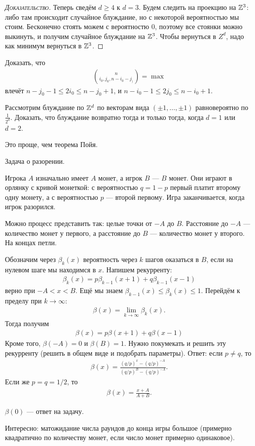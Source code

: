 \documentclass[../main.tex]{subfiles}
\begin{document}
\begin{proof}[\normalfont\textsc{Доказательство}]
 Теперь сведём $ d \geqslant 4 $ к $ d=3 $. Будем следить на проекцию на $ \mathbb{Z}^{3} $: либо там происходит случайное блуждание, но с некоторой вероятностью мы стоим. Бесконечно стоять можем с вероятностю $ 0 $, поэтому все стоянки можно выкинуть, и получим случайное блуждание на $ \mathbb{Z}^{3} $. Чтобы вернуться в $ Z^{d} $, надо как минимум вернуться в $ \mathbb{Z}^{3} $.
\end{proof}
\begin{exercs*}
 Доказать, что 
 \begin{align*}
  \binom{n}{i_0,j_0,n-i_0-j_)} = \max
 \end{align*} влечёт $ n-j_0-1 \leqslant 2i_0 \leqslant n - j_0 + 1 $, и $ n-i_0 - 1 \leqslant 2j_0 \leqslant n - i_0 + 1 $.
\end{exercs*}
\begin{exercs*}
 Рассмотрим блуждание по $ \mathbb{Z}^{d} $ по векторам вида $ (\pm 1, \ldots, \pm 1) $ равновероятно по $ \frac{1}{2^{d}} $. Доказать, что блуждание возвратно тогда и только тогда, когда $ d = 1 $ или $ d = 2 $.

 Это проще, чем теорема Пойя.
\end{exercs*}

Задача о разорении.

 Игрока $ A $ изначально имеет $ A $ монет, а игрок $ B $ --- $ B $ монет. Они играют в орлянку с кривой монеткой: с вероятностью $ q=1-p $ первый платит второму одну монету, а с вероятностью $ p $ --- второй первому. Игра заканчивается, когда игрок разорился.

 Можно процесс представить так: целые точки от $ -A $ до $ B $. Расстояние до $ -A $ --- количество монет у первого, а расстояние до $ B $ --- количество монет у второго. На концах петли. 

 Обозначим через $ \beta_k(x) $ вероятность через $ k $ шагов оказаться в $ B $, если на нулевом шаге мы находимся в $ x $. Напишем рекурренту:
 \begin{align*}
  \beta_k(x) = p \beta_{k-1}(x + 1) + q \beta_{k-1}(x-1)
 \end{align*} верно при $ -A < x < B $. Ещё мы знаем $ \beta_{k-1}(x) \leqslant \beta_k(x) \leqslant 1$. Перейдём к пределу при $ k \to \infty $:
 \begin{align*}
  \beta(x) = \lim_{k \to \infty} \beta_k(x).
 \end{align*} Тогда получим
 \begin{align*}
  \beta(x) = p\beta(x+1) +q\beta(x-1)
 \end{align*} Кроме того, $ \beta(-A) = 0 $ и $ \beta(B) = 1 $. Нужно покумекать и решить эту рекурренту (решить в общем виде и подобрать параметры). Ответ: если $ p \neq q $, то
 \begin{align*}
  \beta(x) = \frac{(q / p)^{x} - (q / p)^{-A}}{(q / p) ^{B} - (q/ p)^{-A}}.
 \end{align*} Если же $ p = q = 1 / 2 $, то
 \begin{align*}
  \beta(x) = \frac{x+A}{A+B}.
 \end{align*}

 $ \beta(0) $ --- ответ на задачу.

 Интересно: матожидание числа раундов до конца игры большое (примерно квадратично по количеству монет, если число монет примерно одинаковое).
\end{document}
